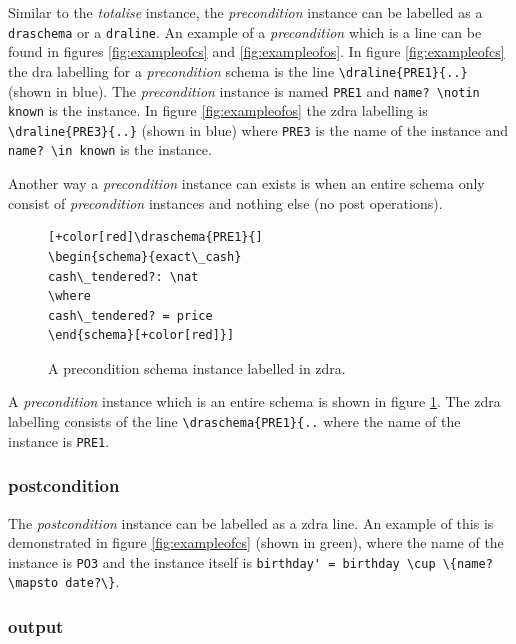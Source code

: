 Similar to the \emph{totalise} instance, the \emph{precondition} instance can be labelled as a \verb|draschema| or a \verb|draline|. An example of a \emph{precondition} which is a line can be found in figures \ref{fig:exampleofcs} and \ref{fig:exampleofos}. In figure \ref{fig:exampleofcs} the \gls{dra} labelling for a \emph{precondition} schema is the line \verb|\draline{PRE1}{..}| (shown in blue). The \emph{precondition} instance is named \verb|PRE1| and \verb|name? \notin known| is the instance. In figure \ref{fig:exampleofos} the \gls{zdra} labelling is \verb|\draline{PRE3}{..}| (shown in blue) where \verb|PRE3| is the name of the instance and \verb|name? \in known| is the instance.

Another way a \emph{precondition} instance can exists is when an entire schema only consist of \emph{precondition} instances and nothing else (no post operations).

\begin{figure}[H]
\centering
\begin{footnotesize}
\begin{BVerbatim}[commandchars=+\[\]]
[+color[red]\draschema{PRE1}{]
\begin{schema}{exact\_cash}
cash\_tendered?: \nat
\where
cash\_tendered? = price
\end{schema}[+color[red]}]
\end{BVerbatim}
\end{footnotesize}
\caption{\label{fig:exampleofpre} A precondition schema instance labelled in \gls{zdra}.}
\end{figure}

A \emph{precondition} instance which is an entire schema is shown in figure \ref{fig:exampleofpre}. The \gls{zdra} labelling consists of the line \verb|\draschema{PRE1}{..| where the name of the instance is \verb|PRE1|.


\subsubsection{postcondition}

The \emph{postcondition} instance can be labelled as a \gls{zdra} line. An example of this is demonstrated in figure \ref{fig:exampleofcs} (shown in green), where the name of the instance is \verb|PO3| and the instance itself is \verb|birthday' = birthday \cup \{name? \mapsto date?\}|.

\subsubsection{output}


